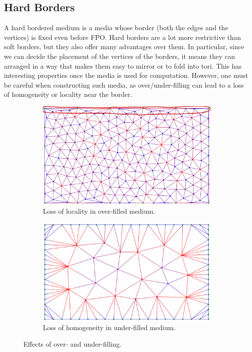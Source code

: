 \documentclass{article}
\begin{document}
\subsection{Hard Borders}

A hard bordered medium is a media whose border (both the edges and the vertices) is fixed even before FPO. Hard borders are a lot more restrictive than soft borders, but they also offer many advantages over them. In particular, since we can decide the placement of the vertices of the borders, it means they can arranged in a way that makes them easy to mirror or to fold into tori. This has interesting properties once the media is used for computation. However, one must be careful when constructing such media, as over/under-filling can lead to a loss of homogeneity or locality near the border.

\begin{figure}[h]
	\centering
	\begin{subfigure}{.5\textwidth}
		\centering \includegraphics[width=0.9\linewidth]{assets/hardOverFilled_lossOfLocality.png}
		\caption{Loss of locality in over-filled medium.}
		\label{fig:hardLossLocality}
	\end{subfigure}%
	\begin{subfigure}{.5\textwidth}
		\centering \includegraphics[width=0.9\linewidth]{assets/hardUnderfilled_lossOfHomogeneity.png}
		\caption{Loss of homogeneity in under-filled medium.}
		\label{fig:hardLossHomogeneity}
	\end{subfigure}
	\caption{Effects of over- and under-filling.}
\end{figure}
\end{document}
